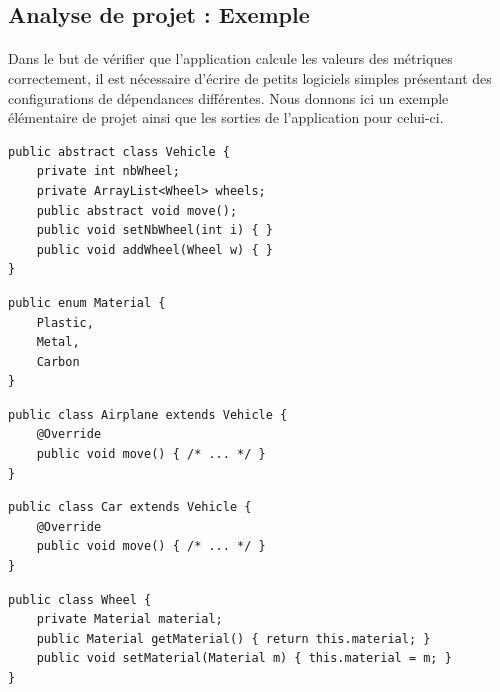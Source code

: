 \documentclass{scrartcl}
\begin{document}
\newpage
\begin{appendices}


\section{Analyse de projet : Exemple}

    \paragraph{}Dans le but de vérifier que l'application calcule les valeurs des métriques correctement, il est nécessaire d'écrire de petits logiciels simples présentant des configurations de dépendances différentes. Nous donnons ici un exemple élémentaire de projet ainsi que les sorties de l'application pour celui-ci.
    
\begin{minipage}{7.5cm}
\begin{lstlisting}[caption=Classe \texttt{Vehicle}]
public abstract class Vehicle {
    private int nbWheel;
    private ArrayList<Wheel> wheels;
    public abstract void move();
    public void setNbWheel(int i) { }
    public void addWheel(Wheel w) { }
}
\end{lstlisting}
\end{minipage}
\hspace{0.5cm}
\begin{minipage}{6cm}
\begin{lstlisting}[caption=Enumeration \texttt{Material}]
public enum Material {
    Plastic,
    Metal,
    Carbon
}
\end{lstlisting}
\end{minipage}
\vspace{0.5cm}
\begin{lstlisting}[caption=Classe \texttt{Airplane}]
public class Airplane extends Vehicle {
    @Override
    public void move() { /* ... */ }
}
\end{lstlisting}
\begin{lstlisting}[caption=Classe \texttt{Car}]
public class Car extends Vehicle {
    @Override
    public void move() { /* ... */ }
}
\end{lstlisting}
\begin{lstlisting}[caption=Classe \texttt{Wheel}]
public class Wheel {
    private Material material;
    public Material getMaterial() { return this.material; }
    public void setMaterial(Material m) { this.material = m; }
}
\end{lstlisting}




\end{appendices}
\end{document}
